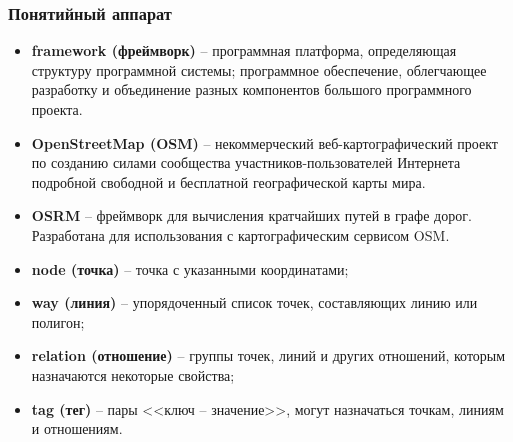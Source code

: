 \begin{frame}
    \frametitle{Понятийный аппарат}
    \footnotesize
    \begin{itemize}\itemsep-5pt
        \item \textbf{framework (фреймворк)} -- программная платформа, определяющая структуру 
            программной системы; программное обеспечение, облегчающее разработку и объединение разных 
            компонентов большого программного проекта.
        \item \textbf{OpenStreetMap (OSM)} -- некоммерческий веб-картографический проект по созданию 
            силами сообщества участников-пользователей Интернета подробной свободной и бесплатной 
            географической карты мира.
        \item \textbf{OSRM} -- фреймворк для вычисления кратчайших путей в графе дорог. Разработана 
            для использования с картографическим сервисом OSM.
        \item \textbf{node (точка)} -- точка с указанными координатами;
        \item \textbf{way (линия)} -- упорядоченный список точек, составляющих линию или полигон;
        \item \textbf{relation (отношение)} -- группы точек, линий и других отношений, которым 
            назначаются некоторые свойства;
        \item \textbf{tag (тег)} -- пары <<ключ -- значение>>, могут назначаться точкам, линиям и 
            отношениям.
    \end{itemize}
\end{frame}

